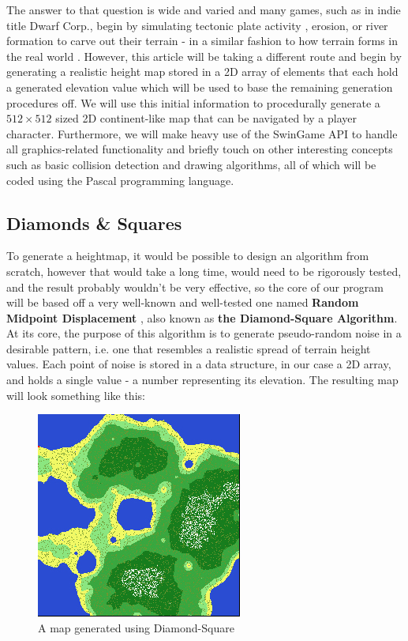 \documentclass{article}
\begin{document}
The answer to that question is wide and varied and many games, such as in indie title Dwarf Corp., begin by simulating tectonic plate activity \parencite{dwarfcorp}, erosion, or river formation to carve out their terrain -  in a similar fashion to how terrain forms in the real world \parencite[pp. 46]{huggett}. However, this article will be taking a different route and begin by generating a realistic height map stored in a 2D array of elements that each hold a generated elevation value which will be used to base the remaining generation procedures off. We will use this initial information to procedurally generate a $512 \times 512$ sized 2D continent-like map that can be navigated by a player character. Furthermore, we will make heavy use of the SwinGame API to handle all graphics-related functionality and briefly touch on other interesting concepts such as basic collision detection and drawing algorithms, all of which will be coded using the Pascal programming language.
	
\subsection{Diamonds \& Squares}

To generate a heightmap, it would be possible to design an algorithm from scratch, however that would take a long time, would need to be rigorously tested, and the result probably wouldn't be very effective, so the core of our program will be based off a very well-known and  well-tested one named \textbf{Random Midpoint Displacement} \parencite{fournier}, also known as \textbf{the Diamond-Square Algorithm}. At its core, the purpose of this algorithm is to generate pseudo-random noise in a desirable pattern, i.e. one that resembles a realistic spread of terrain height values. Each point of noise is stored in a data structure, in our case a 2D array, and holds a single value - a number representing its elevation. The resulting map will look something like this:
	
\begin{figure}[H]
	\centering
	\includegraphics{map.jpg}
	\renewcommand{\figurename}{Example}
	\caption{A map generated using Diamond-Square}
\end{figure}
\end{document}
